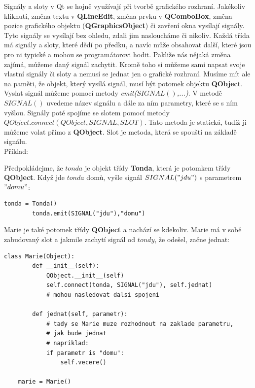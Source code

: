 Signály a sloty v Qt se hojně využívají při tvorbě grafického
rozhraní. Jakékoliv kliknutí, změna textu v \textbf{QLineEdit}, změna
prvku v \textbf{QComboBox}, změna pozice grafického objektu
(\textbf{QGraphicsObject}) či zavření okna vysílají signály. Tyto
signály se vysílají bez ohledu, zdali jim nasloucháme či
nikoliv. Každá třída má signály a sloty, které dědí po předku, a navíc
může obsahovat další, které jsou pro ni typické a mohou se
programátorovi hodit. Pakliže nás nějaká změna zajímá, můžeme daný
signál zachytit. Kromě toho si můžeme sami napsat svoje vlastní
signály či sloty a nemusí se jednat jen o grafické rozhraní. Musíme
mít ale na paměti, že objekt, který vysílá signál, musí být potomek
objektu \textbf{QObject}. Vyslat signál můžeme pomocí
metody \textit{emit($SIGNAL()$,...)}. V metodě $SIGNAL()$ uvedeme
název signálu a dále za ním parametry, které se s ním vyšlou. Signály
poté spojíme se slotem pomocí metody $QObject.connect(QObject, SIGNAL,
SLOT)$. Tato metoda je statická, tudíž ji můžeme volat přímo
z \textbf{QObject}. Slot je metoda, která se spouští na základě
signálu.  \\

\noindent Příklad:

Předpokládejme, že $tonda$ je objekt třídy \textbf{Tonda}, která je
potomkem třídy \textbf{QObject}. Když jde $tonda$ domů, vyšle signál
$SIGNAL("jdu")$ s parametrem $"domu"$: \\


\begin{lstlisting}[label=qtemit,caption={vyslání slotu pod názvem $"jdu"$ s atributem $"domu"$}]
		tonda = Tonda()
		tonda.emit(SIGNAL("jdu"),"domu")
\end{lstlisting}

Marie je také potomek třídy \textbf{QObject} a nachází se kdekoliv. Marie má v sobě zabudovaný slot a jakmile zachytí signál od $tondy$, že odešel, začne jednat: \\


\begin{lstlisting}[label=qtconnect,caption={zachycení signálu $"odesel"$ od tondy}, morekeywords={Marie, SIGNAL, QObject}]
	class Marie(Object):
		def __init__(self):
			QObject.__init__(self)
			self.connect(tonda, SIGNAL("jdu"), self.jednat)
			# mohou nasledovat dalsi spojeni
		
		def jednat(self, parametr):
			# tady se Marie muze rozhodnout na zaklade parametru, 
			# jak bude jednat
			# napriklad:
			if parametr is "domu":
				self.vecere()
		
	marie = Marie()
\end{lstlisting}

